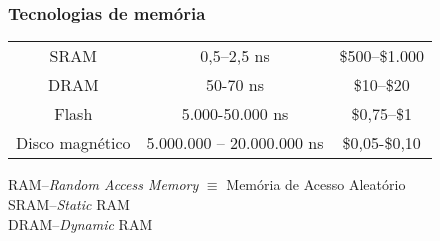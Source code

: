 \lecturetitle{\insertlecture}{\course}
\frame{\maketitle}

\section{\insertlecture}


\begin{frame}
  \frametitle{Tecnologias de memória}

  \def\headcolor{blue!80!black}

  \begin{tabular}[h]{c|c|c} \hline 
    {\color{\headcolor}{Tecnologia}} &
    {\color{\headcolor}{Tempo de acesso}} & {\color{\headcolor}{US\$
        por GB (2012)}}\\ \hline
    SRAM & 0,5--2,5 ns& \$500--\$1.000\\
    DRAM & 50-70 ns& \$10--\$20\\
    Flash & 5.000-50.000 ns& \$0,75--\$1\\
    Disco magnético & 5.000.000 -- 20.000.000 ns & \$0,05-\$0,10\\ \hline
  \end{tabular}

\bigskip\small
\noindent RAM--\emph{Random Access Memory} $\equiv$ Memória de Acesso Aleatório\\
\noindent SRAM--\emph{Static} RAM\\
\noindent DRAM--\emph{Dynamic} RAM\\

\end{frame}

